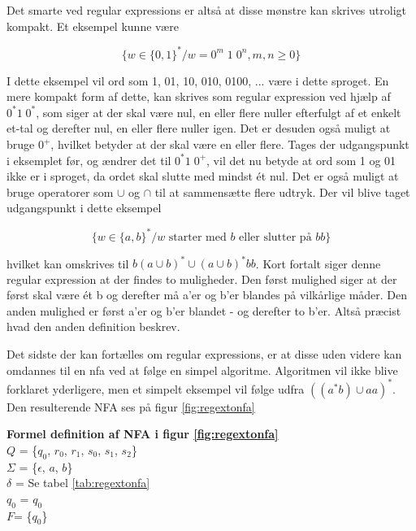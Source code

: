 Det smarte ved regular expressions er altså at disse mønstre kan skrives utroligt kompakt. Et eksempel kunne være 

$$ \{w \in \{0, 1\}^* / w = 0^m\; 1\; 0^n, m,n \geq 0\} $$

\noindent I dette eksempel vil ord som 1, 01, 10, 010, 0100, ... være i dette sproget. En mere kompakt form af dette, kan skrives som regular expression ved hjælp af $ 0^* 1\; 0^* $, som siger at der skal være nul, en eller flere nuller efterfulgt af et enkelt et-tal og derefter nul, en eller flere nuller igen. Det er desuden også muligt at bruge $0^+$, hvilket betyder at der skal være en eller flere. Tages der udgangspunkt i eksemplet før, og ændrer det til $0^* 1\; 0^+$, vil det nu betyde at ord som 1 og 01 ikke er i sproget, da ordet skal slutte med mindst ét nul. Det er også muligt at bruge operatorer som $\cup$ og $\cap$ til at sammensætte flere udtryk. Der vil blive taget udgangspunkt i dette eksempel

$$ \{w \in \{a, b\}^* / w \text{ starter med }b \text{ eller slutter på }bb\} $$

\noindent hvilket kan omskrives til $b(a \cup b)^* \cup (a \cup b)^* bb$. Kort fortalt siger denne regular expression at der findes to muligheder. Den først mulighed siger at der først skal være ét b og derefter må a'er og b'er blandes på vilkårlige måder. Den anden mulighed er først a'er og b'er blandet - og derefter to b'er. Altså præcist hvad den anden definition beskrev.

Det sidste der kan fortælles om regular expressions, er at disse uden videre kan omdannes til en \gls{nfa} ved at følge en simpel algoritme. Algoritmen vil ikke blive forklaret yderligere, men et simpelt eksempel vil følge udfra $((a^*b) \cup aa)^*$. Den resulterende NFA ses på figur \ref{fig:regextonfa}


\noindent \textbf{Formel definition af NFA i figur \ref{fig:regextonfa}}\\
\noindent $Q$ = \{$q_0$, $r_0$, $r_1$, $s_0$, $s_1$, $s_2$\}\\
\noindent $\Sigma$ = \{$\epsilon$, $a$, $b$\}\\
\noindent $\delta$ = Se tabel \ref{tab:regextonfa}\\
\noindent $q_0$ = $q_0$\\
\noindent $F$= \{$q_0$\}\\

